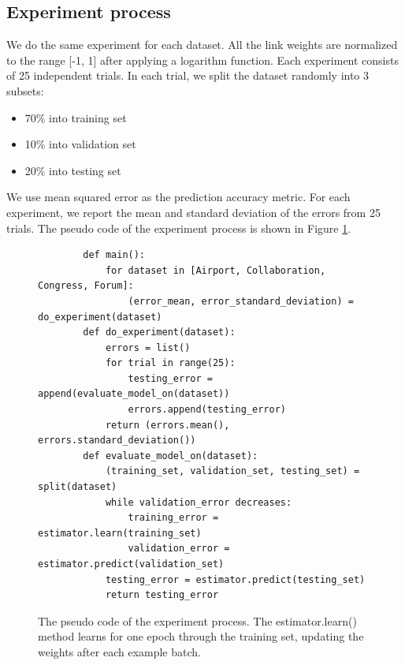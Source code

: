 \documentclass[conference]{IEEEtran}
\begin{document}
\subsection{Experiment process}
We do the same experiment for each dataset.
All the link weights are normalized to the range [-1, 1] after applying a logarithm function.
Each experiment consists of 25 independent trials.
In each trial, we split the dataset randomly into 3 subsets:
\begin{itemize}
	\item 70\% into training set
	\item 10\% into validation set
	\item 20\% into testing set
\end{itemize}
We use mean squared error as the prediction accuracy metric.
For each experiment, we report the mean and standard deviation of the errors from 25 trials.
The pseudo code of the experiment process is shown in Figure \ref{fig:code}.
\begin{figure}[!htb]\centering
	\begin{lstlisting}
		def main():
			for dataset in [Airport, Collaboration, Congress, Forum]:
				(error_mean, error_standard_deviation) = do_experiment(dataset)
		def do_experiment(dataset):
			errors = list()
			for trial in range(25):
				testing_error = append(evaluate_model_on(dataset))
				errors.append(testing_error)
			return (errors.mean(), errors.standard_deviation())
		def evaluate_model_on(dataset):
			(training_set, validation_set, testing_set) = split(dataset)
			while validation_error decreases:
				training_error = estimator.learn(training_set)
				validation_error = estimator.predict(validation_set)
			testing_error = estimator.predict(testing_set)
			return testing_error
	\end{lstlisting}
	\caption{
		The pseudo code of the experiment process.
		The estimator.learn() method learns for one epoch through the training set, updating the weights after each example batch.
	}
	\label{fig:code}
\end{figure}
\end{document}
